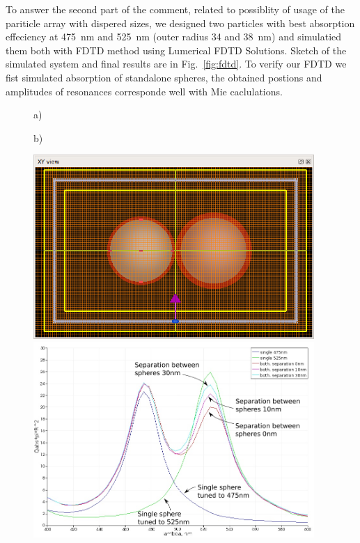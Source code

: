 \documentclass[a4paper]{article}
\begin{document}
To answer the second part of the comment, related to possiblity of
usage of the pariticle array with dispered sizes, we designed two
particles with best absorption effeciency at 475~nm and 525~nm (outer
radius 34 and 38~nm) and
simulatied them both with FDTD method using Lumerical FDTD Solutions.
Sketch of the simulated system and final results are in
Fig.~\ref{fig:fdtd}. To verify our FDTD we fist simulated absorption
of standalone spheres, the obtained postions and amplitudes of
resonances corresponde well with Mie caclulations.
\begin{figure}
  \begin{minipage}[h]{0.49\textwidth}    \begin{flushleft}     a)    \end{flushleft}
  \end{minipage}
  \begin{minipage}[h]{0.49\textwidth}    \begin{flushleft}     b)    \end{flushleft}
  \end{minipage}
  \begin{minipage}[h]{0.49\textwidth} 
   \includegraphics[width=0.95\textwidth]{FDTD-mode-d00}
  \end{minipage}
  \begin{minipage}[h]{0.49\textwidth} 
   \includegraphics[width=0.95\textwidth]{fdtd-spectra}

\end{minipage}
\end{figure}
\end{document}
